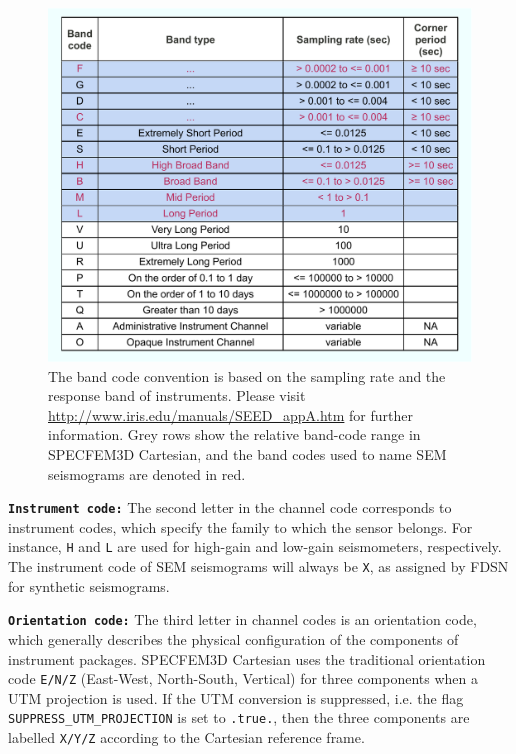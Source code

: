 \begin{figure}[ht]
\noindent \begin{centering}
\includegraphics[scale=0.6]{figures/IRIS_band_codes.pdf}
\par\end{centering}

\caption{The band code convention is based on the sampling rate and the response
band of instruments. Please visit \url{http://www.iris.edu/manuals/SEED_appA.htm}
for further information. Grey rows show the relative band-code range
in SPECFEM3D Cartesian, and the band codes used to name SEM seismograms
are denoted in red.}


\label{fig:IRIS_band_codes}
\end{figure}


\noindent \texttt{\textbf{Instrument code:}} The second letter in
the channel code corresponds to instrument codes, which specify the
family to which the sensor belongs. For instance, \texttt{H} and \texttt{L}
are used for high-gain and low-gain seismometers, respectively. The
instrument code of SEM seismograms will always be \texttt{X}, as assigned
by FDSN for synthetic seismograms. \newline


\noindent \texttt{\textbf{Orientation code:}} The third letter in
channel codes is an orientation code, which generally describes the
physical configuration of the components of instrument packages. SPECFEM3D
Cartesian uses the traditional orientation code \texttt{E/N/Z} (East-West,
North-South, Vertical) for three components when a UTM projection
is used. If the UTM conversion is suppressed, i.e. the flag \texttt{SUPPRESS\_UTM\_PROJECTION}
is set to \texttt{.true.}, then the three components are labelled
\texttt{X/Y/Z} according to the Cartesian reference frame. \newline


